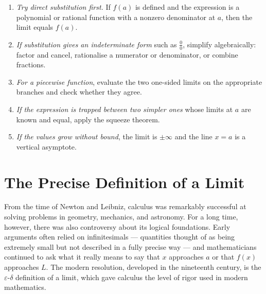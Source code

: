 \begin{strategy}
\begin{enumerate}
    \item \emph{Try direct substitution first.} If \(f(a)\) is defined and the expression is a polynomial or rational function with a nonzero denominator at \(a\), then the limit equals \(f(a)\).
    \item \emph{If substitution gives an indeterminate form} such as \(\tfrac{0}{0}\), simplify algebraically: factor and cancel, rationalise a numerator or denominator, or combine fractions.
    \item \emph{For a piecewise function}, evaluate the two one-sided limits on the appropriate branches and check whether they agree.
    \item \emph{If the expression is trapped between two simpler ones} whose limits at \(a\) are known and equal, apply the squeeze theorem.
    \item \emph{If the values grow without bound}, the limit is \(\pm\infty\) and the line \(x = a\) is a vertical asymptote.
\end{enumerate}
\end{strategy}


\section{The Precise Definition of a Limit}

From the time of Newton and Leibniz, calculus was remarkably successful at solving problems in geometry, mechanics, and astronomy. For a long time, however, there was also controversy about its logical foundations. Early arguments often relied on infinitesimals --- quantities thought of as being extremely small but not described in a fully precise way --- and mathematicians continued to ask what it really means to say that \(x\) approaches \(a\) or that \(f(x)\) approaches \(L\). The modern resolution, developed in the nineteenth century, is the \(\varepsilon\)-\(\delta\) definition of a limit, which gave calculus the level of rigor used in modern mathematics.

